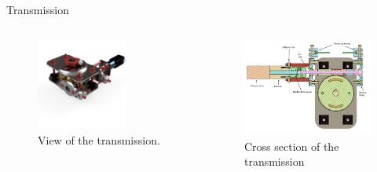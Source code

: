 \documentclass[11pt, aspectratio=169]{beamer}
\begin{document}
\begin{frame}{Transmission}
	\begin{columns}[t]
		\begin{column}{0.45\textwidth}
			\begin{figure}
				\centering
				\includegraphics[width=0.7\textwidth]{figures/Mechanical/transmission.png}
				\caption{View of the transmission.}
				\label{img::mech2}
			\end{figure}
		\end{column}
		\begin{column}{0.45\textwidth}
			\begin{figure}
				\centering
				\includegraphics[width=\textwidth]{figures/Mechanical/Wormshaft_CS.png}
				\caption{Cross section of the transmission}
				\label{img::mech3}
			\end{figure}
		\end{column}
	\end{columns}

\end{frame}
\end{document}
